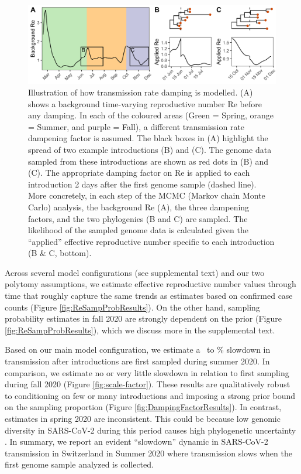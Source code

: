 \documentclass[11pt,twoside,lineno]{pnas-new} %
\begin{document}
\begin{figure}[h!]
\centering
\includegraphics[width=0.75\linewidth]{figures/phylodynamic_method_example.png}
\caption{Illustration of how transmission rate damping is modelled. (A) shows a background time-varying reproductive number Re before any damping. In each of the coloured areas (Green = Spring, orange = Summer, and purple = Fall), a different transmission rate dampening factor is assumed. The black boxes in (A) highlight the spread of two example introductions (B) and (C). The genome data sampled from these introductions are shown as red dots in (B) and (C). The appropriate damping factor on Re is applied to each introduction 2 days after the first genome sample (dashed line). More concretely, in each step of the MCMC (Markov chain Monte Carlo) analysis, the background Re (A), the three dampening factors, and the two phylogenies (B and C) are sampled. The likelihood of the sampled genome data is calculated given the ``applied'' effective reproductive number specific to each introduction (B \& C, bottom).}  
\label{fig:phylo-methods}
\end{figure}

Across several model configurations (see supplemental text) and our two polytomy assumptions, we estimate effective reproductive number values through time that roughly capture the same trends as estimates based on confirmed case counts (Figure \ref{fig:ReSampProbResults}). On the other hand, sampling probability estimates in fall 2020 are strongly dependent on the prior (Figure \ref{fig:ReSampProbResults}), which we discuss more in the supplemental text.

Based on our main model configuration, we estimate a \summermaxdampingpercentmedianCHEnosampUB\ to \summermindampingpercentmedianCHEnosampUB\% slowdown in transmission after introductions are first sampled during summer 2020. In comparison, we estimate no or very little slowdown in relation to first sampling during fall 2020 (Figure \ref{fig:scale-factor}). These results are qualitatively robust to conditioning on few or many introductions and imposing a strong prior bound on the sampling proportion (Figure \ref{fig:DampingFactorResults}). In contrast, estimates in spring 2020 are inconsistent. This could be because low genomic diversity in SARS-CoV-2 during this period causes high phylogenetic uncertainty \cite{Morel2021}. In summary, we report an evident ``slowdown'' dynamic in SARS-CoV-2 transmission in Switzerland in Summer 2020 where transmission slows when the first genome sample analyzed is collected.
\end{document}
